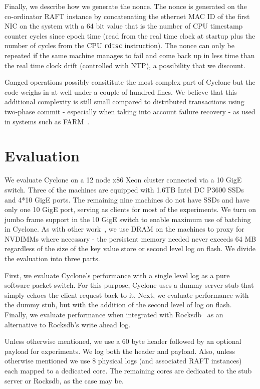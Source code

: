 \documentclass[pageno]{jpaper}
\begin{document}
Finally, we describe how we generate the nonce. The nonce is generated on the
co-ordinator RAFT instance by concatenating the ethernet MAC ID of the first NIC
on the system with a 64 bit value that is the number of CPU timestamp counter
cycles since epoch time (read from the real time clock at startup plus the
number of cycles from the CPU {\tt rdtsc} instruction). The nonce can only be
repeated if the same machine manages to fail and come back up in less time than
the real time clock drift (controlled with NTP), a possibility that we discount.

Ganged operations possibly consititute the most complex part of Cyclone but the
code weighs in at well under a couple of hundred lines. We believe that
this additional complexity is still small compared to distributed transactions
using two-phase commit - especially when taking into account failure recovery -
as used in systems such as FARM~\cite{farm}.

\section{Evaluation}
\label{sec:evaluation}
We evaluate Cyclone on a 12 node x86 Xeon cluster connected via a 10 GigE
switch. Three of the machines are equipped with 1.6TB Intel DC P3600 SSDs and
4*10 GigE ports. The remaining nine machines do not have SSDs and have only one
10 GigE port, serving as clients for most of the experiments. We turn on jumbo
frame support in the 10 GigE switch to enable maximum use of batching in
Cyclone. As with other work~\cite{faast}, we use DRAM on the machines to proxy
for NVDIMMs where necessary - the persistent memory needed never exceeds 64 MB
regardless of the size of the key value store or second level log on flash. We
divide the evaluation into three parts.

First, we evaluate Cyclone's performance with a single level log as a pure
software packet switch. For this purpose, Cyclone uses a dummy server stub that
simply echoes the client request back to it. Next, we evaluate
performance with the dummy stub, but with the addition of the second level of log
on flash. Finally, we evaluate performance when integrated with
Rocksdb~\cite{rocksdb} as an alternative to Rocksdb's write ahead log.

Unless otherwise mentioned, we use a 60 byte header followed by an optional
payload for experiments. We log both the header and payload. Also, unless
otherwise mentioned we use 8 physical logs (and associated RAFT instances) each
mapped to a dedicated core. The remaining cores are dedicated to the stub
server or Rocksdb, as the case may be.
\end{document}
